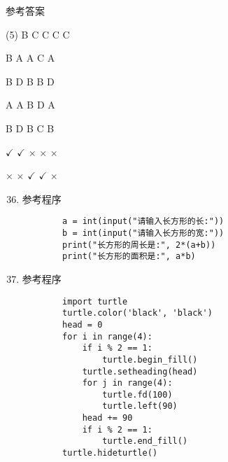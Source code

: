 \documentclass[11pt]{ctexart}
\begin{document}
\begin{center}
    \Huge \heiti 参考答案
\end{center}

    \begin{tasks}[label=\arabic*.](5)
        \task B
        \task C
        \task C
        \task C
        \task C

        \task B
        \task A
        \task A
        \task C
        \task A

        \task B
        \task D
        \task B
        \task B
        \task D

        \task A
        \task A
        \task B
        \task D
        \task A

        \task B
        \task D
        \task B
        \task C
        \task B

        \task $\checkmark$
        \task $\checkmark$
        \task $\times$
        \task $\times$
        \task $\times$

        \task $\times$
        \task $\times$
        \task $\checkmark$
        \task $\checkmark$
        \task $\times$
    \end{tasks}

\begin{enumerate}
    \setcounter{enumi}{35}
    \item 参考程序
    \begin{lstlisting}
        a = int(input("请输入长方形的长:"))
        b = int(input("请输入长方形的宽:"))
        print("长方形的周长是:", 2*(a+b))
        print("长方形的面积是:", a*b)
    \end{lstlisting}

    \item 参考程序
    \begin{lstlisting}
        import turtle
        turtle.color('black', 'black')
        head = 0
        for i in range(4):
            if i % 2 == 1:
                turtle.begin_fill()
            turtle.setheading(head)
            for j in range(4):
                turtle.fd(100)
                turtle.left(90)
            head += 90
            if i % 2 == 1:
                turtle.end_fill()
        turtle.hideturtle()
    \end{lstlisting}
\end{enumerate}
\end{document}

